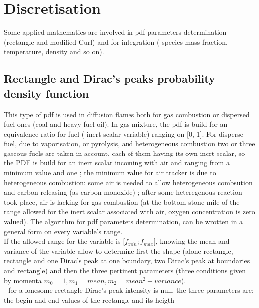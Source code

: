 \section{Discretisation}

Some applied mathematics are involved in pdf parameters determination
({\small rectangle and modified Curl}) and for integration ({\small
species mass fraction, temperature, density and so on}).\\

\subsection{Rectangle and Dirac's peaks probability density function}

This type of pdf is used in diffusion flames both for gas combustion
or dispersed fuel ones ({\small coal and heavy fuel oil}). In gas
mixture, the pdf is build for an equivalence ratio for fuel ({\small
inert scalar variable}) ranging on [0, 1]. For disperse fuel, due to
vaporisation, or pyrolysis, and heterogeneous combustion two or three
gaseous fuels are taken in account, each of them having its own inert
scalar, so the PDF is build for an inert scalar incoming with air and
ranging from a minimum value and one ; the minimum value for air
tracker is due to heterogeneous combustion: some air is needed to
allow heterogeneous combsution and carbon releasing ({\small as carbon
monoxide}) ; after some heteregenous reaction took place, air is
lacking for gas combustion ({\small at the bottom stone mile of the
range allowed for the inert scalar associated with air, oxygen
concentration is zero valued}). The algorithm for pdf parameters
determination, can be wrotten in a general form on every variable's
range.\\

If the allowed range for the variable is [$f_{min} ; f_{max}$],
knowing the mean and variance of the variable allow to determine first
the shape ({\small alone rectangle, rectangle and one Dirac's peak at
one boundary, two Dirac's peak at boundaries and rectangle}) and then
the three pertinent parameters ({\small three conditions given by
momenta $m_{0}=1, m_{1}=mean, m_{2}=mean^{2}+variance$}).\\

- for a lonesome rectangle Dirac's peak intensity is null, the three
  parameters are: the begin and end values of the rectangle and its
  heigth\\

